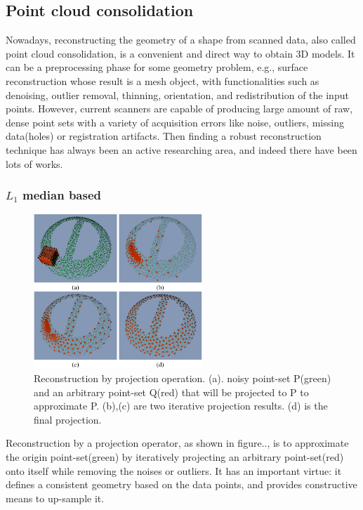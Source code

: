 \label{sec:SRpart2}

\subsection{Point cloud consolidation}

Nowadays, reconstructing the geometry of a shape from scanned data, also called point cloud consolidation, is a convenient and direct way to obtain 3D models. It can be a preprocessing phase for some geometry problem, e.g., surface reconstruction whose result is a mesh object, with functionalities such as denoising, outlier removal, thinning, orientation, and redistribution of the input points. However, current scanners are capable of producing large amount of raw, dense point sets with a variety of acquisition errors like noise, outliers, missing data(holes) or registration artifacts. Then finding a robust reconstruction technique has always been an active researching area, and indeed there have been lots of works.



\subsubsection{$L_1$ median based}

\begin{figure}[ht]
  \centering
  \includegraphics[width=2.5in]{images/L1median}
  \caption{Reconstruction by projection operation. (a). noisy point-set P(green) and an arbitrary point-set Q(red) that will be projected to P to approximate P. (b),(c) are two iterative projection results. (d) is the final projection.}
\end{figure}

Reconstruction by a projection operator, as shown in figure.., is to approximate the origin point-set(green) by iteratively projecting an arbitrary point-set(red) onto itself while removing the noises or outliers.
It has an important virtue: it defines a consistent geometry based on the data points, and provides constructive means to up-sample it.

